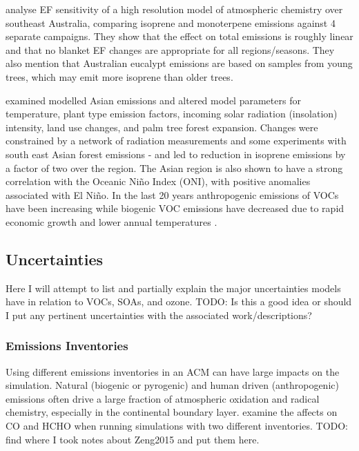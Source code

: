       \cite{Emmerson2016} analyse EF sensitivity of a high resolution model of atmospheric chemistry over southeast Australia, comparing isoprene and monoterpene emissions against 4 separate campaigns.
      They show that the effect on total emissions is roughly linear and that no blanket EF changes are appropriate for all regions/seasons.
      They also mention that Australian eucalypt emissions are based on samples from young trees, which may emit more isoprene than older trees.
      
      \cite{Stavrakou2014} examined modelled Asian emissions and altered model parameters for temperature, plant type emission factors, incoming solar radiation (insolation) intensity, land use changes, and palm tree forest expansion.
      Changes were constrained by a network of radiation measurements and some experiments with south east Asian forest emissions - and led to reduction in isoprene emissions by a factor of two over the region.
      The Asian region is also shown to have a strong correlation with the Oceanic Niño Index (ONI), with positive anomalies associated with El Niño.
      In the last 20 years anthropogenic emissions of VOCs have been increasing while biogenic VOC emissions have decreased due to rapid economic growth and lower annual temperatures \citep{Stavrakou2014, Kwon2017}.
      
  
  \subsection{Uncertainties}
    \label{LR:Models:Unc}
    Here I will attempt to list and partially explain the major uncertainties models have in relation to  VOCs, SOAs, and ozone. 
    TODO: Is this a good idea or should I put any pertinent uncertainties with the associated work/descriptions?
    
    \subsubsection{Emissions Inventories}
      Using different emissions inventories in an ACM can have large impacts on the simulation.
      Natural (biogenic or pyrogenic) and human driven (anthropogenic) emissions often drive a large fraction of atmospheric oxidation and radical chemistry, especially in the continental boundary layer.
      \cite{Zeng2015} examine the affects on CO and HCHO when running simulations with two different inventories.
      TODO: find where I took notes about Zeng2015 and put them here.
    

